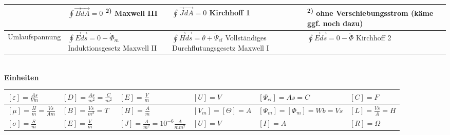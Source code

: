 \begin{tabular}{|p{2.5cm}||p{2.7cm}|p{4cm}|p{2.7cm}|p{5cm}|}
		& \parbox{4cm}{
			\vspace{.1cm}$\oint\vec{B}\vec{dA}=0$
			\textsuperscript{2)} \\
			Maxwell III
			\vspace{.1cm}} 
		& \parbox{2.7cm}{
			$\oint\vec{J}\vec{dA}=0$\\
			Kirchhoff 1}
		& \parbox{5cm}{\textsuperscript{2)} ohne Verschiebungsstrom (käme ggf. noch
		dazu)} \\
	\hline
	Umlaufspannung 
		& \parbox{2.7cm}{
			\vspace{.1cm}
			$\oint\vec{E}\vec{ds}=0-\dot{\Phi}_m$ \\ 
			{\tiny Induktionsgesetz}\\Maxwell II
			\vspace{.1cm}}
		& \parbox{4cm}{
			\vspace{.1cm}
			$\oint\vec{H}\vec{ds}=\theta+\dot{\Psi}_{el}$ \\ 
			{\tiny Vollständiges Durchflutungsgesetz} \\Maxwell I
			\vspace{.1cm}}
		& \parbox{2.7cm}{
			\vspace{.1cm}
			$\oint\vec{E}\vec{ds}=0-\dot{\Phi}$ \\ Kirchhoff 2
			\vspace{.1cm}}
		& \\
	\hline
	\end{tabular}
	\renewcommand{\arraystretch}{1} \\

\textbf{Einheiten}\\
\renewcommand{\arraystretch}{1.2}
	\begin{tabular}{|l|l|l|l|l|l|}
	\hline
	$[\varepsilon] = \frac{As}{Vm}$
		& $[D] = \frac{As}{m^2} = \frac{C}{m^2}$
		& $[E] = \frac{V}{m}$
		& $[U] = V$
		& $[\Psi_{el}] = As = C$
		& $[C] = F$ \\
	\hline
	$[\mu] = \frac{H}{m}=\frac{V s}{A m}$
		& $[B] = \frac{Vs}{m^2} = T$
		& $[H] = \frac{A}{m}$
		& $[V_m] = [\Theta] = A$
		& $[\Psi_m] = [\Phi_m] = Wb = Vs$
		& $[L] = \frac{Vs}{A} = H$ \\
	\hline
	$[\sigma] = \frac{S}{m}$
		& $[E] = \frac{V}{m}$
		& $[J] = \frac{A}{m^2} = 10^{-6} \frac{A}{mm^2}$
		& $[U] = V$
		& $[I] = A$
		& $[R] = \Omega$ \\
	\hline
	\end{tabular}
	\renewcommand{\arraystretch}{1}